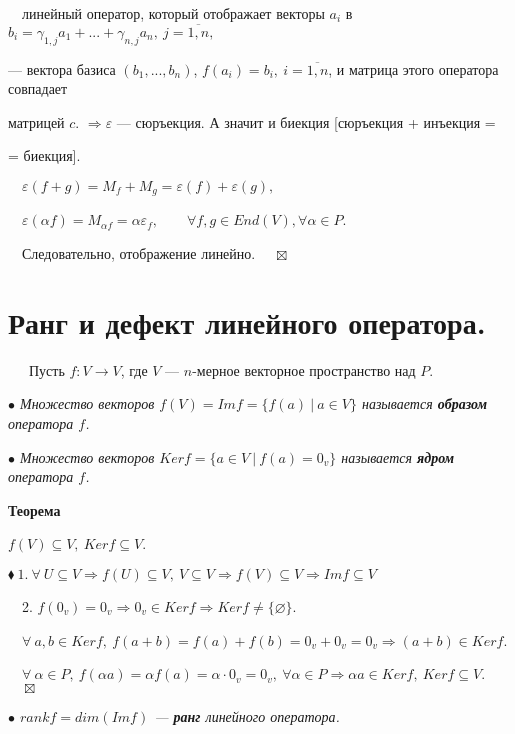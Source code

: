 \documentclass[a4paper, 12pt]{report}
\begin{document}
	$\quad$линейный оператор, который отображает векторы $a_i$ в $b_i = \gamma_{1,j} a_1 +...+\gamma_{n,j} a_n,\ j=\overline{1,n},$ 
	
	\quad--- вектора базиса $(b_1,...,b_n)$, $f(a_i) = b_i,\ i=\overline{1,n}$, и матрица этого оператора совпадает
	
	 матрицей $c$. $\Rightarrow \varepsilon$ --- сюръекция. А значит и биекция [сюръекция + инъекция =
	
	\quad= биекция]. 
	
	\par\bigskip
	$\quad \varepsilon(f+g) = M_f + M_g = \varepsilon(f) + \varepsilon(g),$
	\par
	$\quad \varepsilon(\alpha f) = M_{\alpha f} = \alpha \varepsilon_f, \qquad \forall f,g \in End(V), \forall \alpha \in P$.
	\par
	$\quad$Следовательно, отображение линейно. $\quad\boxtimes$
	
	
	
	
	
	
	
	
	
	
	
	\section{Ранг и дефект линейного оператора.}
	$\quad \; \ $Пусть $f:V\rightarrow V$, где $V$ --- $n$-мерное векторное пространство над $P$.
	\par\bigskip
	\textit{$\bullet$ Множество векторов $f(V) = Imf = \{f(a)\ |\ a\in V\}$ называется \textbf{образом} оператора $f$.}
	
	\textit{$\bullet$ Множество векторов $Ker f = \{a\in V\ |\ f(a) = 0_v\}$ называется \textbf{ядром} оператора $f$.}
	\par\bigskip
	\textbf{Теорема}
	
	\textit{$f(V) \subseteq V,\ Ker f \subseteq V$}.
	\par\bigskip
	$\blacklozenge\ 1.\ \forall\ U \subseteq V \Rightarrow f(U) \subseteq V,\ V \subseteq V\Rightarrow f(V) \subseteq V\Rightarrow Imf \subseteq V$
	
	$\quad$2. $f(0_v) = 0_v \Rightarrow 0_v \in Ker f \Rightarrow Kerf \ne \{\varnothing\}$.
	
	$\quad \forall\ a,b \in Ker f,\ f(a+b) = f(a) + f(b) = 0_v + 0_v = 0_v \Rightarrow (a+b) \in Ker f$.
	
	$\quad \forall\ \alpha \in P,\ f(\alpha a) = \alpha  f(a) = \alpha \cdot 0_v = 0_v,\ \forall \alpha \in P\Rightarrow\alpha a \in Kerf,\ Kerf \subseteq V$. $\quad \boxtimes$
	\par\bigskip
	\textit{$\bullet$ $rankf = dim (Im f)$ --- \textbf{ранг} линейного оператора.}
	
\end{document}
